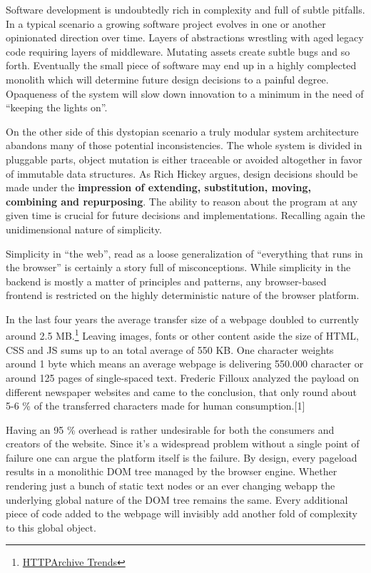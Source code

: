 \documentclass[]{article}
\begin{document}
Software development is undoubtedly rich in complexity and full of
subtle pitfalls. In a typical scenario a growing software project
evolves in one or another opinionated direction over time. Layers of
abstractions wrestling with aged legacy code requiring layers of
middleware. Mutating assets create subtle bugs and so forth. Eventually
the small piece of software may end up in a highly complected monolith
which will determine future design decisions to a painful degree.
Opaqueness of the system will slow down innovation to a minimum in the
need of ``keeping the lights on''.

On the other side of this dystopian scenario a truly modular system
architecture abandons many of those potential inconsistencies. The whole
system is divided in pluggable parts, object mutation is either
traceable or avoided altogether in favor of immutable data structures.
As Rich Hickey argues, design decisions should be made under the
\textbf{impression of extending, substitution, moving, combining and
repurposing}. The ability to reason about the program at any given time
is crucial for future decisions and implementations. Recalling again the
unidimensional nature of simplicity.

Simplicity in ``the web'', read as a loose generalization of
``everything that runs in the browser'' is certainly a story full of
misconceptions. While simplicity in the backend is mostly a matter of
principles and patterns, any browser-based frontend is restricted on the
highly deterministic nature of the browser platform.

In the last four years the average transfer size of a webpage doubled to
currently around 2.5 MB.\footnote{\href{http://httparchive.org/trends.php}{HTTPArchive
  Trends}} Leaving images, fonts or other content aside the size of
HTML, CSS and JS sums up to an total average of 550 KB. One character
weights around 1 byte which means an average webpage is delivering
550.000 character or around 125 pages of single-spaced text. Frederic
Filloux analyzed the payload on different newspaper websites and came to
the conclusion, that only round about 5-6 \% of the transferred
characters made for human consumption.{[}1{]}

Having an 95 \% overhead is rather undesirable for both the consumers
and creators of the website. Since it's a widespread problem without a
single point of failure one can argue the platform itself is the
failure. By design, every pageload results in a monolithic DOM tree
managed by the browser engine. Whether rendering just a bunch of static
text nodes or an ever changing webapp the underlying global nature of
the DOM tree remains the same. Every additional piece of code added to
the webpage will invisibly add another fold of complexity to this global
object.
\end{document}
